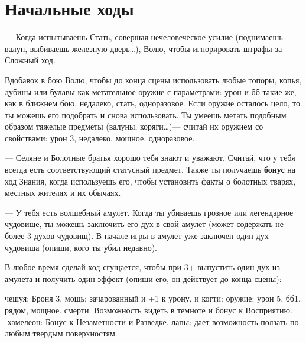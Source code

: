 \documentclass[10pt,twoside]{report}
\begin{document}
\section*{Начальные ходы}
\begin{description}[noitemsep]
\item[Силач]--- Когда испытываешь Стать, совершая нечеловеческое
  усилие (поднимаешь валун, выбиваешь железную дверь\ldots),
  { Волю}, чтобы игнорировать штрафы за Сложный
  ход.

  Вдобавок в бою { Волю}, чтобы до конца сцены
  использовать любые топоры, копья, дубины или булавы как метательное
  оружие с параметрами: урон и бб такие же, как в ближнем бою,
  недалеко, стать, одноразовое. Если оружие осталось цело, то ты
  можешь его подобрать и снова использовать. Ты умеешь метать подобным
  образом тяжелые предметы (валуны, коряги\ldots)--- считай их оружием
  со свойствами: урон 3, недалеко, мощное, одноразовое.
  
  \vfill
  
  \item[Тутейший]--- Селяне и Болотные братья хорошо тебя знают и
  уважают. Считай, что у тебя всегда есть соответствующий статусный
  предмет. Также ты получаешь \textbf{бонус} на ход Знания, когда
  используешь его, чтобы установить факты о болотных тварях, местных
  жителях и их обычаях.

\vfill
  
  \pagebreak
  
\item[Клык цмока (ход на привале)]--- У тебя есть волшебный
  амулет. Когда ты убиваешь грозное или легендарное чудовище, ты
  можешь заключить его дух в свой амулет (может содержать не более 3
  духов чудовищ). В начале игры в амулет уже заключен один дух
  чудовища (опиши, кого ты убил недавно).

  В любое время сделай ход { сгущается}, чтобы при 3+
  выпустить один дух из амулета и получить один эффект (опиши его, он
  действует до конца сцены): 
  \begin{itemize}
   чешуя: Броня 3.
   мощь: зачарованный и +1 к урону.
   и когти: оружие: урон 5, бб1, рядом, мощное.
   смерти: Возможность видеть в темноте и бонус к Восприятию.
  -хамелеон: Бонус к Незаметности и Разведке.
   лапы: дает возможность ползать по любым твердым поверхностям.
  \end{itemize}


\end{description}
\end{document}

